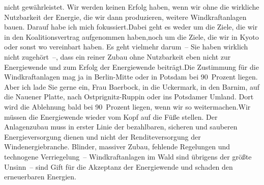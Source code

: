 \documentclass{article}
\begin{document}
nicht gewährleistet. Wir werden keinen Erfolg haben, wenn wir ohne die wirkliche Nutzbarkeit der Energie, die wir dann produzieren, weitere Windkraftanlagen bauen. Darauf habe ich mich fokussiert.Dabei geht es weder um die Ziele, die wir in den Koalitionsvertrag aufgenommen haben,noch um die Ziele, die wir in Kyoto oder sonst wo vereinbart haben. Es geht vielmehr darum – Sie haben wirklich nicht zugehört –, dass ein reiner Zubau ohne Nutzbarkeit eben nicht zur Energiewende und zum Erfolg der Energiewende beiträgt.Die Zustimmung für die Windkraftanlagen mag ja in Berlin-Mitte oder in Potsdam bei 90 Prozent liegen. Aber ich lade Sie gerne ein, Frau Baerbock, in die Uckermark, in den Barnim, auf die Nauener Platte, nach Ostprignitz-Ruppin oder ins Potsdamer Umland. Dort wird die Ablehnung bald bei 90 Prozent liegen, wenn wir so weitermachen.Wir müssen die Energiewende wieder vom Kopf auf die Füße stellen. Der Anlagenzubau muss in erster Linie der bezahlbaren, sicheren und sauberen Energieversorgung dienen und nicht der Renditeversorgung der Windenergiebranche. Blinder, massiver Zubau, fehlende Regelungen und technogene Verriegelung – Windkraftanlagen im Wald sind übrigens der größte Unsinn – sind Gift für die Akzeptanz der Energiewende und schaden den erneuerbaren Energien.
\end{document}
